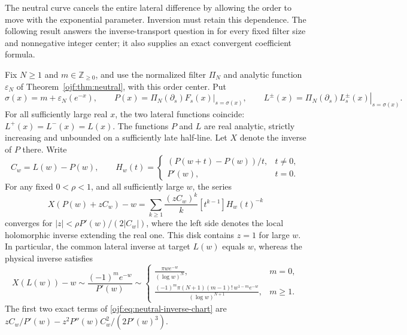 The neutral curve cancels the entire lateral difference by allowing the
order to move with the exponential parameter. Inversion must retain this
dependence. The following result answers the inverse-transport question
in \cite{ojf:report} for every fixed filter size and nonnegative integer
center; it also supplies an exact convergent coefficient formula.

\begin{theorem}
\label{ojf:thm:neutral-inverse}
Fix $N\ge1$ and $m\in\mathbb Z_{\ge0}$, and use the normalized filter
$\Pi_N$ and analytic function $\varepsilon_N$ of
Theorem~\ref{ojf:thm:neutral}, with this order center. Put
\[
 \sigma(x)=m+\varepsilon_N(e^{-x}),\qquad
 P(x)=\left.\Pi_N(\partial_s)F_s(x)\right|_{s=\sigma(x)},\qquad
 L^\pm(x)=\left.\Pi_N(\partial_s)L_s^\pm(x)\right|_{s=\sigma(x)}.
\]
For all sufficiently large real $x$, the two lateral functions coincide:
$L^+(x)=L^-(x)=L(x)$. The functions $P$ and $L$ are real analytic,
strictly increasing and unbounded on a sufficiently late half-line.
Let $X$ denote the inverse of $P$ there. Write
\[
 C_w=L(w)-P(w),\qquad
 H_w(t)=\begin{cases}(P(w+t)-P(w))/t,&t\ne0,\\P'(w),&t=0.\end{cases}
\]
For any fixed $0<\rho<1$, and all sufficiently large $w$, the series
\begin{equation}\label{ojf:eq:neutral-inverse-chart}
 X(P(w)+zC_w)-w
   =\sum_{k\ge1}\frac{(zC_w)^k}{k}
                 [t^{k-1}]H_w(t)^{-k}
\end{equation}
converges for $|z|<\rho P'(w)/(2|C_w|)$, where the left side denotes
the local holomorphic inverse extending the real one. This disk contains
$z=1$ for large $w$. In particular, the common lateral inverse at target
$L(w)$ equals $w$, whereas the physical inverse satisfies
\begin{equation}\label{ojf:eq:neutral-inverse-shift}
 X(L(w))-w\sim\frac{(-1)^m e^{-w}}{P'(w)}
 \sim
 \begin{cases}
 \displaystyle\frac{\pi w e^{-w}}{(\log w)^N},&m=0,\\[6pt]
 \displaystyle\frac{(-1)^m\pi(N+1)(m-1)!\,w^{1-m}e^{-w}}
                         {(\log w)^{N+1}},&m\ge1.
 \end{cases}
\end{equation}
The first two exact terms of \eqref{ojf:eq:neutral-inverse-chart} are
$zC_w/P'(w)-z^2P''(w)C_w^2/(2P'(w)^3)$.
\end{theorem}

